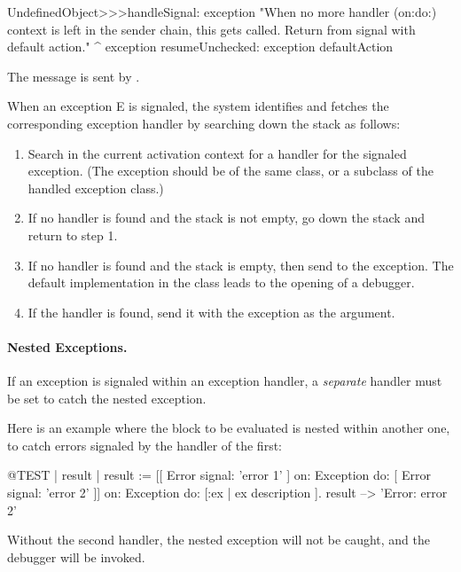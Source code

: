 \documentclass[a4paper,10pt,twoside]{book}
\begin{document}
\begin{code}
UndefinedObject>>>handleSignal: exception
	"When no more handler (on:do:) context is left in the sender chain, this gets called.  Return from signal with default action."
	^ exception resumeUnchecked: exception defaultAction
\end{code}

The message  is sent by . 

When an exception E is signaled, the system identifies and fetches the corresponding exception handler by searching down the stack as follows:

\begin{enumerate}

\item Search in the current activation context for a handler for the signaled exception.
(The exception should be of the same class, or a subclass of the handled exception class.)

\item If no handler is found and the stack is not empty, go down the stack and return to step 1.

\item If no handler is found and the stack is empty, then send  to the exception. The default implementation in the  class leads to the opening of a debugger.

\item If the handler is found, send it  with the exception as the argument.

\end{enumerate}

\paragraph{Nested Exceptions.}
If an exception is signaled within an exception handler, a \emph{separate} handler must be set to catch the nested exception.

Here is an example where the block to be evaluated is nested within another one, to catch errors signaled by the handler of the first:
\begin{code}{@TEST | result |}
result := [[ Error signal: 'error 1' ]
	on: Exception
	do: [ Error signal: 'error 2' ]]
		on: Exception
		do: [:ex | ex description ].
result --> 'Error: error 2'
\end{code}

Without the second handler, the nested exception will not be caught, and the debugger will be invoked.
\end{document}
